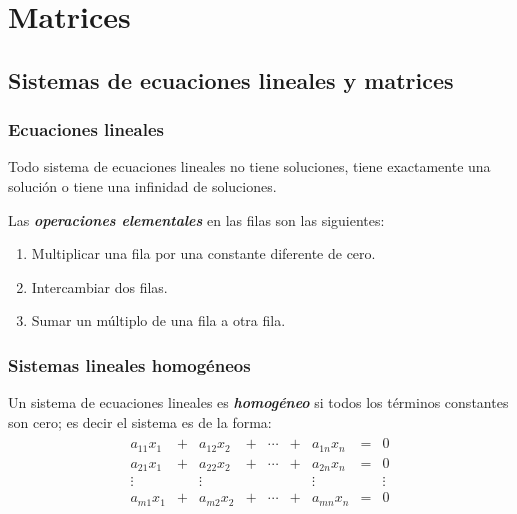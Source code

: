 \documentclass[a4paper,12pt]{article}
\begin{document}

\section{Matrices}


\subsection{Sistemas de ecuaciones lineales y matrices}

\subsubsection{Ecuaciones lineales}

\begin{concept}[i]
  Todo sistema de ecuaciones lineales no tiene soluciones, tiene exactamente
  una solución o tiene una infinidad de soluciones.
\end{concept}

Las \textbf{\emph{operaciones elementales}} en las filas son las siguientes:

\begin{concept}
  \begin{enumerate}
    \item Multiplicar una fila por una constante diferente de cero.
    \item Intercambiar dos filas.
    \item Sumar un múltiplo de una fila a otra fila.
  \end{enumerate}
\end{concept}

\subsubsection{Sistemas lineales homogéneos}
Un sistema de ecuaciones lineales es \textbf{\emph{homogéneo}} si todos los
términos constantes son cero; es decir el sistema es de la forma:
\begin{align*}
  \begin{matrix}
    a_{11}x_1 &+& a_{12}x_2 &+& \cdots &+& a_{1n}x_n &=& 0     \\
    a_{21}x_1 &+& a_{22}x_2 &+& \cdots &+& a_{2n}x_n &=& 0     \\
    \vdots    & &\vdots     & &        & &\vdots     & & \vdots\\
    a_{m1}x_1 &+& a_{m2}x_2 &+& \cdots &+& a_{mn}x_n &=& 0
  \end{matrix}
\end{align*}
\end{document}
